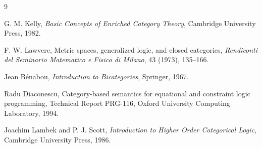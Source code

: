 \documentclass[11pt]{article}
\begin{document}
\begin{thebibliography}{9}

G. M. Kelly,
\textit{Basic Concepts of Enriched Category Theory},
Cambridge University Press, 1982.

F. W. Lawvere,
Metric spaces, generalized logic, and closed categories,
\textit{Rendiconti del Seminario Matematico e Fisico di Milano}, 43 (1973), 135--166.

Jean B\'enabou,
\textit{Introduction to Bicategories},
Springer, 1967.

Radu Diaconescu,
Category-based semantics for equational and constraint logic programming,
Technical Report PRG-116, Oxford University Computing Laboratory, 1994.

Joachim Lambek and P. J. Scott,
\textit{Introduction to Higher Order Categorical Logic},
Cambridge University Press, 1986.

\end{thebibliography}
\end{document}
